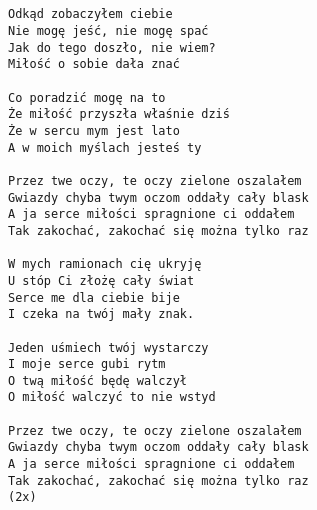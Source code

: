 \documentclass[12pt]{article}
\begin{document}
\subsection*{}
\begin{verbatim}
Odkąd zobaczyłem ciebie
Nie mogę jeść, nie mogę spać
Jak do tego doszło, nie wiem?
Miłość o sobie dała znać

Co poradzić mogę na to
Że miłość przyszła właśnie dziś
Że w sercu mym jest lato
A w moich myślach jesteś ty

Przez twe oczy, te oczy zielone oszalałem
Gwiazdy chyba twym oczom oddały cały blask
A ja serce miłości spragnione ci oddałem
Tak zakochać, zakochać się można tylko raz

W mych ramionach cię ukryję
U stóp Ci złożę cały świat
Serce me dla ciebie bije
I czeka na twój mały znak.

Jeden uśmiech twój wystarczy
I moje serce gubi rytm
O twą miłość będę walczył
O miłość walczyć to nie wstyd

Przez twe oczy, te oczy zielone oszalałem
Gwiazdy chyba twym oczom oddały cały blask
A ja serce miłości spragnione ci oddałem
Tak zakochać, zakochać się można tylko raz
(2x)
\end{verbatim}
\clearpage

\end{document}
